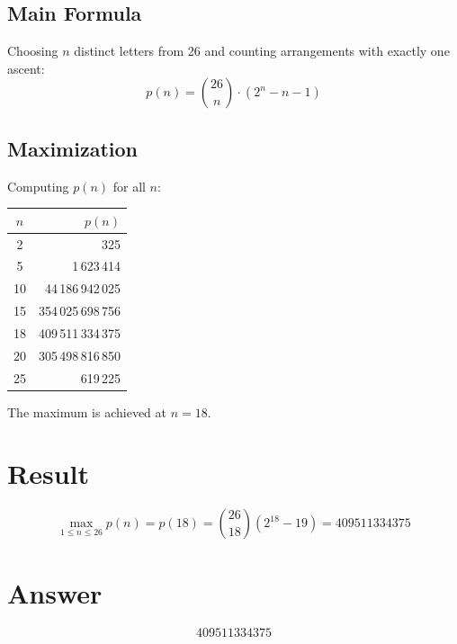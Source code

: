 \documentclass[12pt,a4paper]{article}
\theoremstyle{definition}
\begin{document}
\subsection{Main Formula}

Choosing $n$ distinct letters from 26 and counting arrangements with exactly one ascent:
\[
p(n) = \binom{26}{n} \cdot (2^n - n - 1)
\]

\subsection{Maximization}

Computing $p(n)$ for all $n$:

\begin{center}
\begin{tabular}{|c|r|}
\hline
$n$ & $p(n)$ \\
\hline
2 & 325 \\
5 & 1\,623\,414 \\
10 & 44\,186\,942\,025 \\
15 & 354\,025\,698\,756 \\
18 & 409\,511\,334\,375 \\
20 & 305\,498\,816\,850 \\
25 & 619\,225 \\
\hline
\end{tabular}
\end{center}

The maximum is achieved at $n = 18$.

\section{Result}

\[
\max_{1 \le n \le 26} p(n) = p(18) = \binom{26}{18}(2^{18} - 19) = \boxed{409511334375}
\]

\section{Answer}

\[
\boxed{409511334375}
\]
\end{document}
